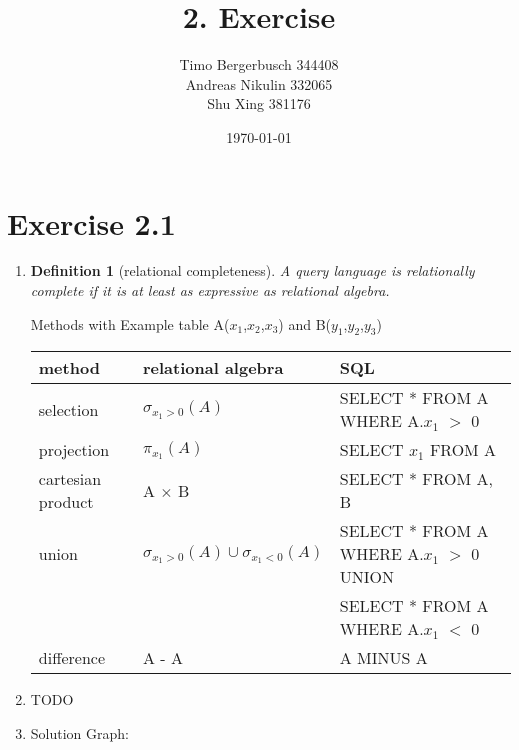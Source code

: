 \documentclass[12pt]{article}
\newtheorem{definition}[theorem]{Definition}
\begin{document}
	
	\title{2. Exercise}
	\author{Timo Bergerbusch 344408 \\ Andreas Nikulin 332065 \\ Shu Xing 381176}
	\date{\specialdate\today}
	\maketitle
	
	\section{Exercise 2.1}
	\begin{enumerate}[label=2.1.\arabic*]
		\item \begin{definition}[relational completeness]
			A query language is relationally complete if it is at least as expressive as relational algebra.
		\end{definition}
		Methods with Example table A(\underline{$x_1$},$x_2$,$x_3$) and B(\underline{$y_1$},$y_2$,$y_3$) \\
		\begin{tabular}[c]{l | l | l}
			method & relational algebra & SQL \\ \hline \hline
			selection & $\sigma_{x_1 > 0}(A)$ & SELECT * FROM A WHERE A.$x_1$ $>$ 0 \\
			projection & $\pi_{x_1}(A)$ & SELECT $x_1$ FROM A \\
			cartesian product & A $\times$ B & SELECT * FROM A, B \\
			union & $\sigma_{x_1 > 0}(A) \cup \sigma_{x_1 < 0}(A)$ & SELECT * FROM A WHERE A.$x_1$ $>$ 0  UNION \\
			& & SELECT * FROM A WHERE A.$x_1$ $<$ 0  \\
			difference & A - A & A MINUS A \\
		\end{tabular}
		\item TODO %
		\item Solution Graph:
			\begin{figure}[H]
				\centering
\end{figure}
\end{enumerate}
\end{document}
